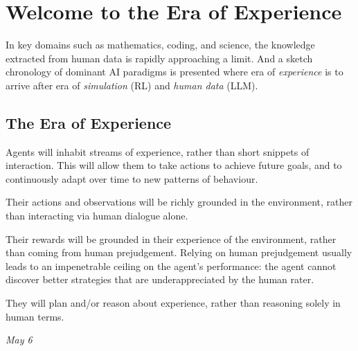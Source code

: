 \section*{Welcome to the Era of Experience}

\textbf{\cite{silver2025welcome}}

In key domains such as mathematics, coding, and science, the knowledge extracted from human data is rapidly approaching a limit.
And a sketch chronology of dominant AI paradigms is presented where era of \textit{experience} is to arrive after era of \textit{simulation} (RL) and \textit{human data} (LLM).

\subsection*{The Era of Experience}

Agents will inhabit streams of experience, rather than short snippets of interaction. This will allow them to take actions to achieve future goals, and to continuously adapt over time to new patterns of behaviour.

Their actions and observations will be richly grounded in the environment, rather than interacting via human dialogue alone.

Their rewards will be grounded in their experience of the environment, rather than coming from human prejudgement. Relying on human prejudgement usually leads to an impenetrable ceiling on the agent’s performance: the agent cannot discover better strategies that are underappreciated by the human rater.

They will plan and/or reason about experience, rather than reasoning solely in human terms.

\medskip
\textit{May 6}
